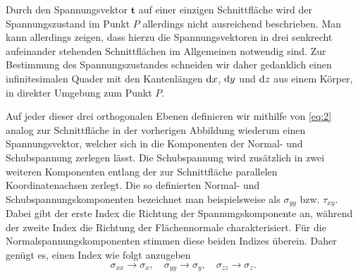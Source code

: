 \documentclass{lecture}
\begin{document}
    Durch den Spannungsvektor \(\bm{t}\) auf einer einzigen Schnittfläche wird der Spannungszustand im Punkt \(P\) allerdings nicht ausreichend beschrieben.
    Man kann allerdings zeigen, dass hierzu die Spannungsvektoren in drei senkrecht aufeinander stehenden Schnittflächen im Allgemeinen notwendig sind.
    Zur Bestimmung des Spannungszustandes schneiden wir daher gedanklich einen infinitesimalen Quader mit den Kantenlängen \(\mathop{\mathrm{d}\!} x\), \(\mathop{\mathrm{d}\!} y\) und \(\mathop{\mathrm{d}\!} z\) aus einem Körper, in direkter Umgebung zum Punkt \(P\).
    \begin{center}
    \end{center}
    Auf jeder dieser drei orthogonalen Ebenen definieren wir mithilfe von \eqref{eq:2} analog zur Schnittfläche in der vorherigen Abbildung wiederum einen Spannungsvektor, welcher sich in die Komponenten der Normal- und Schubspannung zerlegen lässt.
    Die Schubspannung wird zusätzlich in zwei weiteren Komponenten entlang der zur Schnittfläche parallelen Koordinatenachsen zerlegt.
    Die so definierten Normal- und Schubspannungskomponenten bezeichnet man beispielsweise als \(\sigma_{yy}\) bzw. \(\tau_{xy}\).
    Dabei gibt der erste Index die Richtung der Spannungskomponente an, während der zweite Index die Richtung der Flächennormale charakterisiert.
    Für die Normalspannungskomponenten stimmen diese beiden Indizes überein.
    Daher genügt es, einen Index wie folgt anzugeben
    \[
        \sigma_{xx} \to \sigma_x, \quad \sigma_{yy} \to \sigma_y, \quad \sigma_{zz} \to \sigma_z.
    \]
\end{document}
